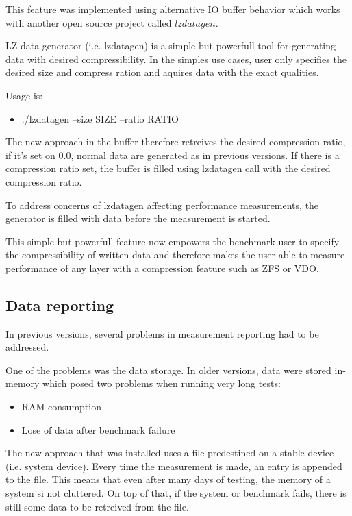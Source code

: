 \documentclass[
  color, %
  table, %
  lof,   %
  lot,   %
]{fithesis3}
\begin{document}
This feature was implemented using alternative IO buffer behavior which works with another open source project called $lzdatagen$.

LZ data generator (i.e. lzdatagen) is a simple but powerfull tool for generating data with desired compressibility. In the simples use cases, user only specifies the desired size and compress ration and aquires data with the exact qualities.

Usage is:
\begin{itemize}
    \item ./lzdatagen --size SIZE --ratio RATIO
\end{itemize}

The new approach in the buffer therefore retreives the desired compression ratio, if it's set on 0.0, normal data are generated as in previous versions. If there is a compression ratio set, the buffer is filled using lzdatagen call with the desired compression ratio.

To address concerns of lzdatagen affecting performance measurements, the generator is filled with data before the measurement is started.

This simple but powerfull feature now empowers the benchmark user to specify the compressibility of written data and therefore makes the user able to measure performance of any layer with a compression feature such as ZFS or VDO.

\subsection{Data reporting}
In previous versions, several problems in measurement reporting had to be addressed.

One of the problems was the data storage. In older versions, data were stored in-memory which posed two problems when running very long tests:
\begin{itemize}
    \item RAM consumption
    \item Lose of data after benchmark failure
\end{itemize}

The new approach that was installed uses a file predestined on a stable device (i.e. system device). Every time the measurement is made, an entry is appended to the file. This means that even after many days of testing, the memory of a system si not cluttered. On top of that, if the system or benchmark fails, there is still some data to be retreived from the file.
\end{document}
